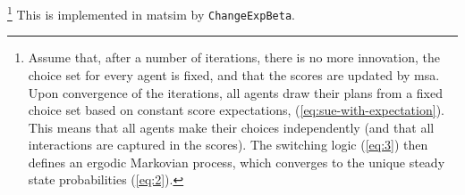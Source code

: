 \footnote{%
%
%
%
%
%
%
%
Assume that, after a number of iterations, there is no more
innovation, \ie the choice set for every agent is fixed, and that
the scores are updated by \gls{msa}.
Upon convergence of the iterations, all agents draw their plans from
a fixed choice set based on constant score expectations, 
\cf (\ref{eq:sue-with-expectation}).
This means that all agents make their choices independently
(and that all interactions are captured in the scores).
The switching logic (\ref{eq:3}) then defines an ergodic Markovian process,
which converges to the unique steady state probabilities (\ref{eq:2}).
%
}
%
This is implemented in \gls{matsim} by \lstinline{ChangeExpBeta}.

